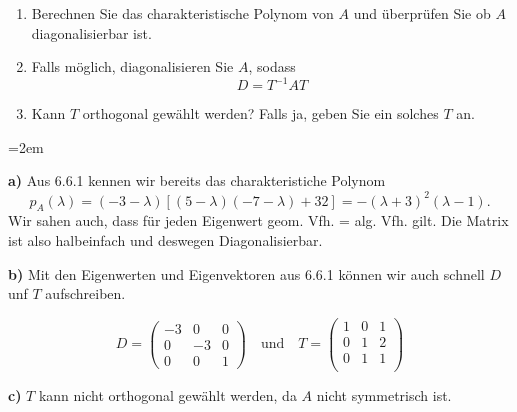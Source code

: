 \begin{enumerate}[label=\alph*)]
    \item Berechnen Sie das charakteristische Polynom von \( A \) und überprüfen Sie ob \( A \) diagonalisierbar ist.
    \item Falls möglich, diagonalisieren Sie \( A \), sodass \[ D = T^{-1}AT\]
    \item Kann \( T \) orthogonal gewählt werden? Falls ja, geben Sie ein solches \( T \) an.
\end{enumerate}

\vspace{1\baselineskip}

\begin{solution}    

    \vspace{1\baselineskip}

    \leftskip=2em

    \textbf{a)} Aus 6.6.1 kennen wir bereits das charakteristiche Polynom \[ p_A(\lambda) = (-3 - \lambda) \left[ (5 - \lambda)(-7 - \lambda) + 32 \right] = - (\lambda + 3)^2(\lambda - 1). \] Wir sahen auch, dass für jeden Eigenwert geom. Vfh. = alg. Vfh. gilt. Die Matrix ist also halbeinfach und deswegen Diagonalisierbar.

    \vspace{1\baselineskip}

    \textbf{b)} Mit den Eigenwerten und Eigenvektoren aus 6.6.1 können wir auch schnell \( D \) unf \( T \) aufschreiben. 

    \begin{equation*}
        D = \begin{pmatrix}
        -3 & 0 & 0 \\
        0 & -3 & 0 \\
        0 & 0 & 1 
        \end{pmatrix} \quad \text{und} \quad T = \begin{pmatrix}
            1 & 0 & 1 \\
            0 & 1 & 2 \\
            0 & 1 & 1 \\
        \end{pmatrix}
    \end{equation*}

    \vspace{1\baselineskip}

    \textbf{c)} \( T \) kann nicht orthogonal gewählt werden, da \( A \) nicht symmetrisch ist.

\end{solution}

